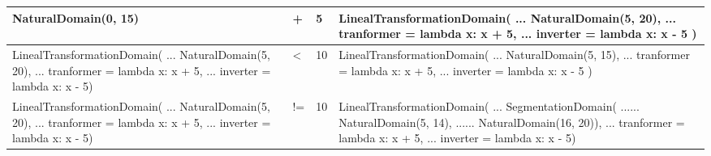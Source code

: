 \begin{longtable}{ | p{6cm} | p{2cm}| p{3.5cm}| p{6.5cm}|  }
    \hline
    NaturalDomain(0, 15)              &
    +                                 &
    5                                 &
    LinealTransformationDomain(\newline
    ... NaturalDomain(5, 20), \newline
    ... tranformer = lambda x: x + 5, \newline
    ... inverter = lambda x: x - 5 )                                                                    \\
    \hline
    LinealTransformationDomain(\newline
    ... NaturalDomain(5, 20),\newline
    ... tranformer = lambda x: x + 5,\newline
    ... inverter = lambda x: x - 5)   &
    <                                 &
    10                                &
    LinealTransformationDomain(\newline
    ... NaturalDomain(5, 15),\newline
    ... tranformer = lambda x: x + 5,\newline
    ... inverter = lambda x: x - 5 )                                                                    \\
    \hline
    LinealTransformationDomain(\newline
    ... NaturalDomain(5, 20),\newline
    ... tranformer = lambda x: x + 5, \newline
    ... inverter = lambda x: x - 5)   &
    !=                                &
    10                                &
    LinealTransformationDomain(\newline
    ... SegmentationDomain(\newline
    ...... NaturalDomain(5, 14), \newline
    ...... NaturalDomain(16, 20)), \newline
    ... tranformer = lambda x: x + 5,\newline
    ... inverter = lambda x: x - 5)                                                                     \\
    \hline
\end{longtable}

